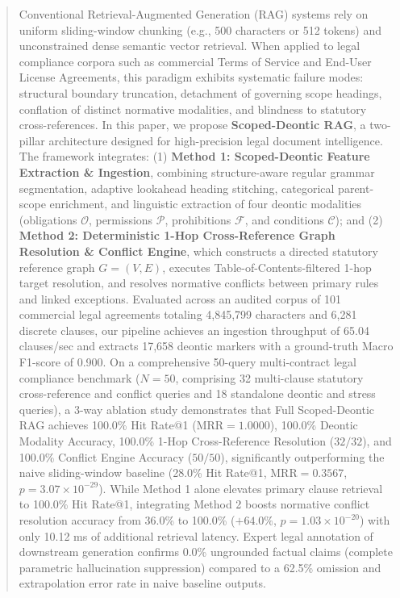 \documentclass[conference]{IEEEtran}
\begin{document}
\begin{abstract}
Conventional Retrieval-Augmented Generation (RAG) systems rely on uniform sliding-window chunking (e.g., 500 characters or 512 tokens) and unconstrained dense semantic vector retrieval. When applied to legal compliance corpora such as commercial Terms of Service and End-User License Agreements, this paradigm exhibits systematic failure modes: structural boundary truncation, detachment of governing scope headings, conflation of distinct normative modalities, and blindness to statutory cross-references. In this paper, we propose \textbf{Scoped-Deontic RAG}, a two-pillar architecture designed for high-precision legal document intelligence. The framework integrates: (1) \textbf{Method 1: Scoped-Deontic Feature Extraction \& Ingestion}, combining structure-aware regular grammar segmentation, adaptive lookahead heading stitching, categorical parent-scope enrichment, and linguistic extraction of four deontic modalities (obligations $\mathcal{O}$, permissions $\mathcal{P}$, prohibitions $\mathcal{F}$, and conditions $\mathcal{C}$); and (2) \textbf{Method 2: Deterministic 1-Hop Cross-Reference Graph Resolution \& Conflict Engine}, which constructs a directed statutory reference graph $G=(V,E)$, executes Table-of-Contents-filtered 1-hop target resolution, and resolves normative conflicts between primary rules and linked exceptions. Evaluated across an audited corpus of 101 commercial legal agreements totaling 4,845,799 characters and 6,281 discrete clauses, our pipeline achieves an ingestion throughput of 65.04 clauses/sec and extracts 17,658 deontic markers with a ground-truth Macro F1-score of 0.900. On a comprehensive 50-query multi-contract legal compliance benchmark ($N=50$, comprising 32 multi-clause statutory cross-reference and conflict queries and 18 standalone deontic and stress queries), a 3-way ablation study demonstrates that Full Scoped-Deontic RAG achieves 100.0\% Hit Rate@1 ($\text{MRR} = 1.0000$), 100.0\% Deontic Modality Accuracy, 100.0\% 1-Hop Cross-Reference Resolution ($32/32$), and 100.0\% Conflict Engine Accuracy ($50/50$), significantly outperforming the naive sliding-window baseline (28.0\% Hit Rate@1, $\text{MRR} = 0.3567$, $p = 3.07 \times 10^{-29}$). While Method 1 alone elevates primary clause retrieval to 100.0\% Hit Rate@1, integrating Method 2 boosts normative conflict resolution accuracy from 36.0\% to 100.0\% ($+64.0\%$, $p = 1.03 \times 10^{-20}$) with only 10.12 ms of additional retrieval latency. Expert legal annotation of downstream generation confirms 0.0\% ungrounded factual claims (complete parametric hallucination suppression) compared to a 62.5\% omission and extrapolation error rate in naive baseline outputs.
\end{abstract}
\end{document}

